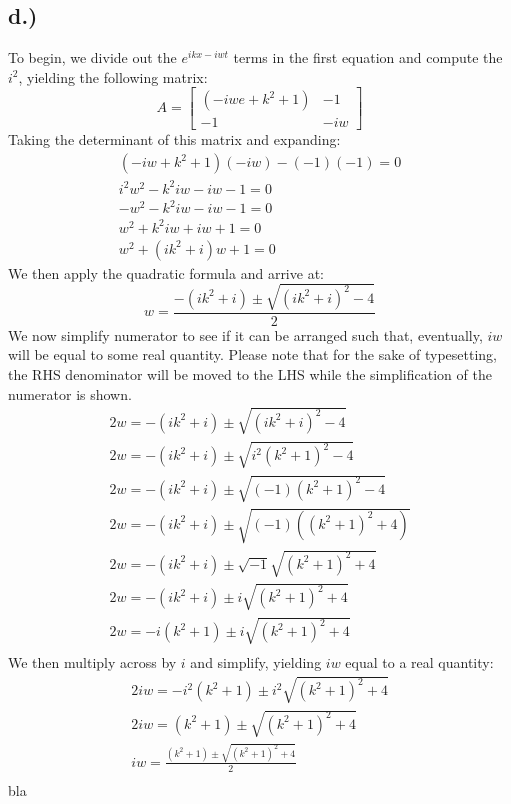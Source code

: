 \documentclass{article}
\begin{document}
\subsection*{d.)}
To begin, we divide out the $e^{ikx - iwt}$ terms in the first equation and compute the $i^2$, yielding the following matrix:
\[
A =
\begin{bmatrix}
(-iwe + k^2 + 1) & -1\\
-1 & -iw
\end{bmatrix}
\]
Taking the determinant of this matrix and expanding:
\begin{equation}
\begin{aligned}
(-iw + k^2 + 1)(-iw) - (-1)(-1) = 0\\
i^2w^2 - k^2iw - iw -1 = 0\\
-w^2 - k^2iw -iw -1 = 0\\
w^2 + k^2iw + iw + 1 = 0\\
w^2 + (ik^2 + i)w + 1 =0
\end{aligned}
\end{equation}
We then apply the quadratic formula and arrive at:
\begin{equation}
w = \frac{-(ik^2 + i) \pm \sqrt{(ik^2 + i)^2 -4}}{2}
\end{equation}
We now simplify numerator to see if it can be arranged such that, eventually, $iw$ will be equal to some real quantity. Please note that for the sake of typesetting, the RHS denominator will be moved to the LHS while the simplification of the numerator is shown.
\begin{equation}
\begin{aligned}
2w = -(ik^2 + i) \pm \sqrt{(ik^2 + i)^2 -4}\\
2w = -(ik^2 + i) \pm \sqrt{i^2(k^2 + 1)^2 -4}\\
2w = -(ik^2 + i) \pm \sqrt{(-1)(k^2 + 1)^2 -4}\\
2w = -(ik^2 + i) \pm \sqrt{(-1)((k^2 + 1)^2 +4)}\\
2w = -(ik^2 + i) \pm \sqrt{-1}\sqrt{(k^2 + 1)^2 +4}\\
2w = -(ik^2 + i) \pm i\sqrt{(k^2 + 1)^2 +4}\\
2w = -i(k^2 + 1) \pm i\sqrt{(k^2 + 1)^2 +4}\\
\end{aligned}
\end{equation}
We then multiply across by $i$ and simplify, yielding $iw$ equal to a real quantity:
\begin{equation}
\begin{aligned}
2iw = -i^2(k^2 + 1) \pm i^2\sqrt{(k^2 + 1)^2 +4}\\
2iw = (k^2 + 1) \pm \sqrt{(k^2 + 1)^2 +4}\\
iw = \frac{(k^2 + 1) \pm \sqrt{(k^2 + 1)^2 +4}}{2}\\
\end{aligned}
\end{equation}
bla
\end{document}
